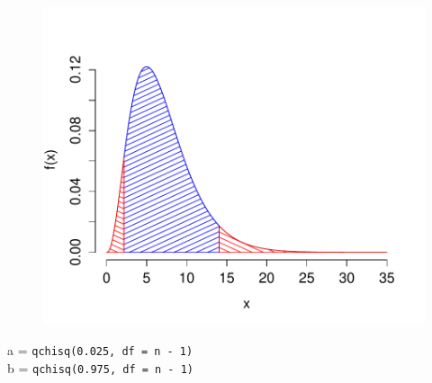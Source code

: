 \documentclass[handout]{beamer}
\begin{document}
\begin{frame}
\begin{figure}
\centering
\includegraphics[scale = 0.55]{./images/chisq_tails}
\end{figure}

a = \texttt{qchisq(0.025, df = n - 1)} \\

b = \texttt{qchisq(0.975, df = n - 1)} 
\end{frame}
\end{document}
